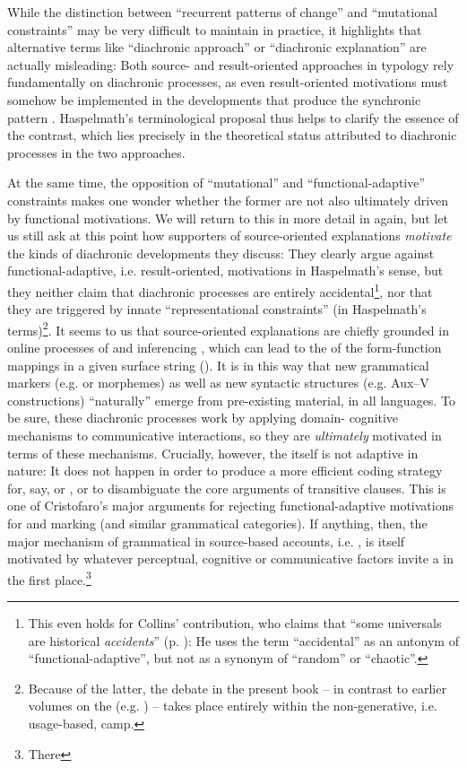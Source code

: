 \documentclass[output=paper]{langsci/langscibook}
\begin{document}
While the distinction between “recurrent patterns of change” and “mutational constraints” may be very difficult to maintain in practice, it highlights that alternative terms like “diachronic approach” or “diachronic explanation” are actually misleading: Both source- and result-oriented approaches in typology rely fundamentally on diachronic processes, as even result-oriented motivations must somehow be implemented in the developments that produce the synchronic pattern \citep{Haspelmath1999_Opt}. Haspelmath’s terminological proposal thus helps to clarify the essence of the contrast, which lies precisely in the theoretical status attributed to diachronic processes in the two approaches. 

At the same time, the opposition of “mutational” and “functional-adaptive” constraints makes one wonder whether the former are not also ultimately driven by functional motivations. We will return to this  in more detail in  again, but let us still ask at this point how supporters of source-oriented explanations \textit{motivate} the kinds of diachronic developments they discuss: They clearly argue against functional-adaptive, i.e. result-oriented, motivations in Haspelmath’s sense, but they neither claim that diachronic processes are entirely accidental\largerpage\footnote{This even holds for Collins’ contribution, who claims that “some universals are historical \textit{accidents}” (p. \pageref{p:collins:historicalaccidents}): He uses the term “accidental” as an antonym of “functional-adaptive”, but not as a synonym of “random” or “chaotic”.}, nor that they are triggered by innate “representational constraints” (in Haspelmath’s terms)\footnote{Because of the latter, the debate in the present book – in contrast to earlier volumes on the  (e.g. \citealt{Hawkins1988_ExplEd,Good2008_Change}) – takes place entirely within the non-generative, i.e. usage-based, camp.}. It seems to us that source-oriented explanations are chiefly grounded in online processes of  and inferencing \citep{Bybee2010}, which can lead to the  of the form-function mappings in a given surface string (\citealt{Croft2000,DeSmet2009}). It is in this way that new grammatical markers (e.g.  or  morphemes) as well as new syntactic structures (e.g. Aux–V constructions) “naturally” emerge from pre-existing material, in all languages. To be sure, these diachronic processes work by applying domain- cognitive mechanisms to communicative interactions, so they are \textit{ultimately} motivated in terms of these mechanisms. Crucially, however, the  itself is not adaptive in nature: It does not happen in order to produce a more efficient coding strategy for, say,  or , or to disambiguate the core arguments of transitive clauses. This is one of Cristofaro’s major arguments for rejecting functional-adaptive motivations for  and  marking (and similar grammatical categories). If anything, then, the major mechanism of grammatical  in source-based accounts, i.e. , is itself motivated by whatever perceptual, cognitive or communicative factors invite a  in the first place.\footnote{There 
}
\end{document}

